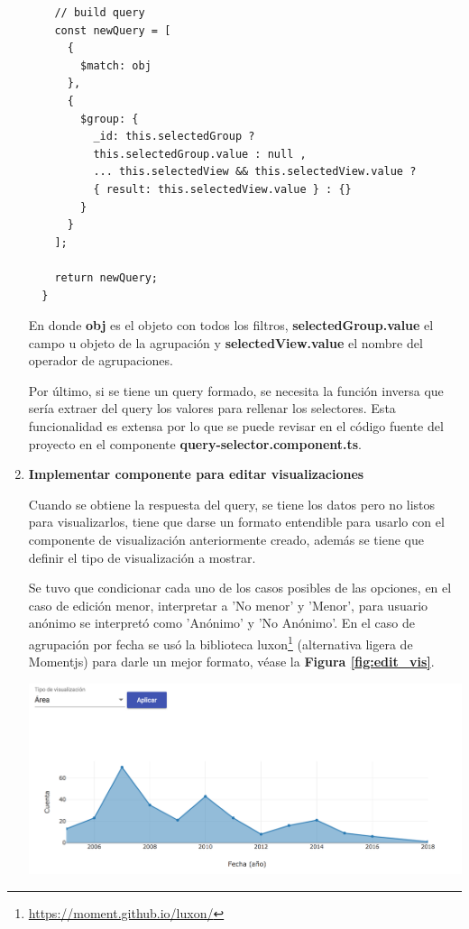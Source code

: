 \begin{enumerate}
\begin{verbatim}
    // build query
    const newQuery = [
      {
        $match: obj
      },
      {
        $group: {
          _id: this.selectedGroup ?
          this.selectedGroup.value : null ,
          ... this.selectedView && this.selectedView.value ?
          { result: this.selectedView.value } : {}
        }
      }
    ];

    return newQuery;
  }
  \end{verbatim}
  
  En donde \textbf{obj} es el objeto con todos los filtros, \textbf{selectedGroup.value} el campo u objeto de la agrupación y \textbf{selectedView.value} el nombre del operador de agrupaciones.
  
  Por último, si se tiene un query formado, se necesita la función inversa que sería extraer del query los valores para rellenar los selectores. Esta funcionalidad es extensa por lo que se puede revisar en el código fuente del proyecto en el componente \textbf{query-selector.component.ts}.
  
  \smallbreak
  \item\textbf{Implementar componente para editar visualizaciones}
  \smallbreak

  Cuando se obtiene la respuesta del query, se tiene los datos pero no listos para visualizarlos, tiene que darse un formato entendible para usarlo con el componente de visualización anteriormente creado, además se tiene que definir el tipo de visualización a mostrar.
  
  
  Se tuvo que condicionar cada uno de los casos posibles de las opciones, en el caso de edición menor, interpretar a 'No menor' y 'Menor', para usuario anónimo se interpretó como 'Anónimo' y 'No Anónimo'. En el caso de agrupación por fecha se usó la biblioteca luxon\footnote{\url{https://moment.github.io/luxon/}} (alternativa ligera de Momentjs) para darle un mejor formato, véase la \textbf{Figura \ref{fig:edit_vis}}.
  
  
  \begin{center}
      \bigbreak
      \includegraphics[scale=0.35]{images/marco_aplicativo/edit_vis.png}
      \label{fig:edit_vis}
      \bigbreak
  \end{center}
  

\end{enumerate}
